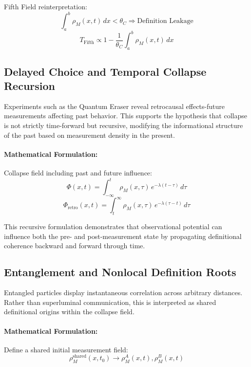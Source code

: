 Fifth Field reinterpretation:
\begin{equation}
\int_a^b \rho_M(x,t) \, dx < \theta_C \Rightarrow \text{Definition Leakage}
\end{equation}
\begin{equation}
T_{\text{Fifth}} \propto 1 - \frac{1}{\theta_C} \int_a^b \rho_M(x,t) \, dx
\end{equation}

\subsection{Delayed Choice and Temporal Collapse Recursion}
Experiments such as the Quantum Eraser reveal retrocausal effects-future measurements affecting past behavior. This supports the hypothesis that collapse is not strictly time-forward but recursive, modifying the informational structure of the past based on measurement density in the present.

\paragraph{Mathematical Formulation:}
Collapse field including past and future influence:
\begin{equation}
\Phi(x,t) = \int_{-\infty}^{t} \rho_M(x,\tau) \, e^{-\lambda(t - \tau)} \, d\tau
\end{equation}
\begin{equation}
\Phi_{\text{retro}}(x,t) = \int_{t}^{\infty} \rho_M(x,\tau) \, e^{-\lambda(\tau - t)} \, d\tau
\end{equation}

This recursive formulation demonstrates that observational potential can influence both the pre- and post-measurement state by propagating definitional coherence backward and forward through time.

\subsection{Entanglement and Nonlocal Definition Roots}
Entangled particles display instantaneous correlation across arbitrary distances. Rather than superluminal communication, this is interpreted as shared definitional origins within the collapse field.

\paragraph{Mathematical Formulation:}
Define a shared initial measurement field:
\begin{equation}
\rho_M^{\text{shared}}(x,t_0) \rightarrow \rho_M^A(x,t), \rho_M^B(x,t)
\end{equation}

